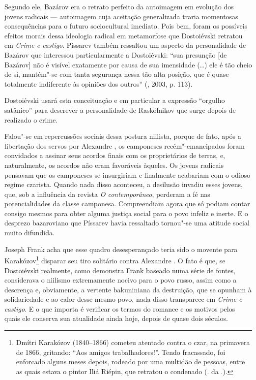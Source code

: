 Segundo ele, Bazárov era o retrato perfeito da autoimagem em evolução
dos jovens radicais --- autoimagem cuja aceitação generalizada traria
momentosas consequências para o futuro sociocultural imediato. Pois bem,
foram os possíveis efeitos morais dessa ideologia radical em metamorfose
que Dostoiévski retratou em \emph{Crime e castigo}. Píssarev também
ressaltou um aspecto da personalidade de Bazárov que interessou
particularmente a Dostoiévski: ``sua presunção [de Bazárov] não é
visível exatamente por causa de sua imensidade (\ldots{}) ele é tão cheio de
si, mantém"-se com tanta segurança nessa tão alta posição, que é quase
totalmente indiferente às opiniões dos outros'' (, 2003, p. 113).

Dostoiévski usará esta conceituação e em particular a expressão
``orgulho satânico'' para descrever a personalidade de Raskólnikov que
surge depois de realizado o crime.

Falou"-se em repercussões sociais dessa postura niilista, porque de fato,
após a libertação dos servos por Alexandre , os camponeses
recém"-emancipados foram convidados a assinar seus acordos finais com os
proprietários de terras, e, naturalmente, os acordos não eram favoráveis
àqueles. Os jovens radicais pensavam que os camponeses se insurgiriam e
finalmente acabariam com o odioso regime czarista. Quando nada disso
aconteceu, a desilusão invadiu esses jovens, que, sob a influência da
revista \emph{O contemporâneo}, perderam a fé nas potencialidades da
classe camponesa. Compreendiam agora que só podiam contar consigo mesmos
para obter alguma justiça social para o povo infeliz e inerte. E o
desprezo bazaroviano que Píssarev havia ressaltado tornou"-se uma atitude
social muito difundida.

Joseph Frank acha que esse quadro desesperançado teria sido o movente
para Karakózov\footnote{Dmítri Karakózov (1840--1866) cometeu atentado
  contra o czar, na primavera de 1866, gritando: ``Aos amigos
  trabalhadores!''. Tendo fracassado, foi enforcado alguns meses depois,
  rodeado por uma multidão de pessoas, entre as quais estava o pintor
  Iliá Riépin, que retratou o condenado (. da .).} disparar seu tiro
solitário contra Alexandre . O fato é que, se Dostoiévski realmente,
como demonstra Frank baseado numa série de fontes, considerava o
niilismo extremamente nocivo para o povo russo, assim como a descrença
e, obviamente, a vertente bakuniniana da destruição, que se opunham à
solidariedade e ao calor desse mesmo povo, nada disso transparece em
\emph{Crime e castigo}. E o que importa é verificar os termos do romance
e os motivos pelos quais ele conserva sua atualidade ainda hoje, depois
de quase dois séculos.

